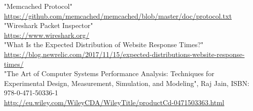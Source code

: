 \documentclass[11pt,a4paper]{article}
\begin{document}
\begin{thebibliography}{40}

"Memcached Protocol"\\
\url{https://github.com/memcached/memcached/blob/master/doc/protocol.txt}\\

"Wireshark Packet Inspector"\\
\url{https://www.wireshark.org/} \\

"What Is the Expected Distribution of Website Response Times?"\\
\url{https://blog.newrelic.com/2017/11/15/expected-distributions-website-response-times/}\\

"The Art of Computer Systems Performance Analysis: Techniques for Experimental Design, Measurement, Simulation, and Modeling", Raj Jain,
ISBN: 978-0-471-50336-1\\
\url{http://eu.wiley.com/WileyCDA/WileyTitle/productCd-0471503363.html}\\

\end{thebibliography}
\end{document}
